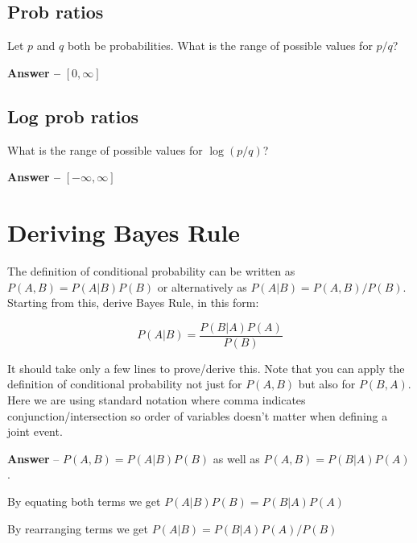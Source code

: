 \documentclass[11pt,letterpaper]{article}
\theoremstyle{definition}
\begin{document}
\subsection{Prob ratios}
Let $p$ and $q$ both be probabilities.
What is the range of possible values for $p/q$?

\textbf{Answer  -- }$[0, \infty]$

\subsection{Log prob ratios}
What is the range of possible values for $\log(p/q)$?

\textbf{Answer --} $[-\infty, \infty]$
%
%
%

%
%

\section{Deriving Bayes Rule}

The definition of conditional probability can be written as $P(A,B) = P(A|B)P(B)$ or alternatively as $P(A|B) = P(A,B)/P(B)$.
Starting from this, derive Bayes Rule, in this form:

\[ P(A|B) = \frac{P(B|A) P(A)}{P(B)} \]

\noindent
It should take only a few lines to prove/derive this.  Note that you can apply the definition of conditional probability not just for $P(A,B)$ but also for $P(B,A)$.  Here we are using standard notation where comma indicates conjunction/intersection so order of variables doesn't matter when defining a joint event.\newline


\textbf{Answer} --  $P(A,B) = P(A|B)P(B)$ as well as $P(A,B) = P(B|A)P(A)$.

By equating both terms we get  $P(A|B)P(B) = P(B|A)P(A)$

By rearranging terms we get $P(A|B) = P(B|A)P(A)/P(B)$

%
%
\end{document}
